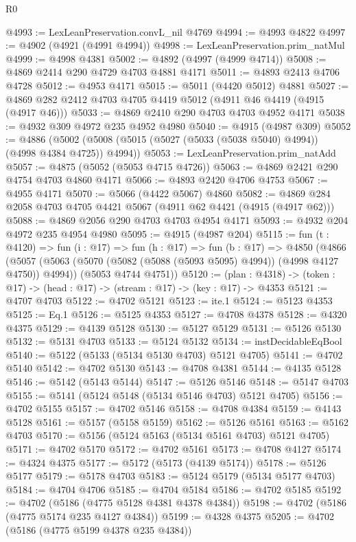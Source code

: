 \begin{lexlean}{R0}
\begin{coremodule}
@4993 := LexLeanPreservation.convL_nil @4769
@4994 := @4993 @4822
@4997 := @4902 (@4921 (@4991 @4994))
@4998 := LexLeanPreservation.prim_natMul
@4999 := @4998 @4381
@5002 := @4892 (@4997 (@4999 @4714))
@5008 := @4869 @2414 @290 @4729 @4703 @4881 @4171
@5011 := @4893 @2413 @4706 @4728
@5012 := @4953 @4171
@5015 := @5011 (@4420 @5012) @4881
@5027 := @4869 @282 @2412 @4703 @4705 @4419 @5012 (@4911 @46 @4419 (@4915 (@4917 @46)))
@5033 := @4869 @2410 @290 @4703 @4703 @4952 @4171
@5038 := @4932 @309 @4972 @235 @4952 @4980
@5040 := @4915 (@4987 @309)
@5052 := @4886 (@5002 (@5008 (@5015 (@5027 (@5033 (@5038 @5040) @4994)) (@4998 @4384 @4725)) @4994))
@5053 := LexLeanPreservation.prim_natAdd
@5057 := @4875 (@5052 (@5053 @4715 @4726))
@5063 := @4869 @2421 @290 @4754 @4703 @4860 @4171
@5066 := @4893 @2420 @4706 @4753
@5067 := @4955 @4171
@5070 := @5066 (@4422 @5067) @4860
@5082 := @4869 @284 @2058 @4703 @4705 @4421 @5067 (@4911 @62 @4421 (@4915 (@4917 @62)))
@5088 := @4869 @2056 @290 @4703 @4703 @4954 @4171
@5093 := @4932 @204 @4972 @235 @4954 @4980
@5095 := @4915 (@4987 @204)
@5115 := fun (t : @4120) =>
  fun (i : @17) =>
  fun (h : @17) =>
  fun (b : @17) =>
  @4850
    (@4866
      (@5057 (@5063 (@5070 (@5082 (@5088 (@5093 @5095) @4994)) (@4998 @4127 @4750)) @4994))
      (@5053 @4744 @4751))
@5120 := (plan : @4318) -> (token : @17) -> (head : @17) -> (stream : @17) -> (key : @17) -> @4353
@5121 := @4707 @4703
@5122 := @4702 @5121
@5123 := ite.{1}
@5124 := @5123 @4353
@5125 := Eq.{1}
@5126 := @5125 @4353
@5127 := @4708 @4378
@5128 := @4320 @4375
@5129 := @4139 @5128
@5130 := @5127 @5129
@5131 := @5126 @5130
@5132 := @5131 @4703
@5133 := @5124 @5132
@5134 := instDecidableEqBool
@5140 := @5122 (@5133 (@5134 @5130 @4703) @5121 @4705)
@5141 := @4702 @5140
@5142 := @4702 @5130
@5143 := @4708 @4381
@5144 := @4135 @5128
@5146 := @5142 (@5143 @5144)
@5147 := @5126 @5146
@5148 := @5147 @4703
@5155 := @5141 (@5124 @5148 (@5134 @5146 @4703) @5121 @4705)
@5156 := @4702 @5155
@5157 := @4702 @5146
@5158 := @4708 @4384
@5159 := @4143 @5128
@5161 := @5157 (@5158 @5159)
@5162 := @5126 @5161
@5163 := @5162 @4703
@5170 := @5156 (@5124 @5163 (@5134 @5161 @4703) @5121 @4705)
@5171 := @4702 @5170
@5172 := @4702 @5161
@5173 := @4708 @4127
@5174 := @4324 @4375
@5177 := @5172 (@5173 (@4139 @5174))
@5178 := @5126 @5177
@5179 := @5178 @4703
@5183 := @5124 @5179 (@5134 @5177 @4703)
@5184 := @4704 @4706
@5185 := @4704 @5184
@5186 := @4702 @5185
@5192 := @4702 (@5186 (@4775 @5128 @4381 @4378 @4384))
@5198 := @4702 (@5186 (@4775 @5174 @235 @4127 @4384))
@5199 := @4328 @4375
@5205 := @4702 (@5186 (@4775 @5199 @4378 @235 @4384))

\end{coremodule}
\end{lexlean}
